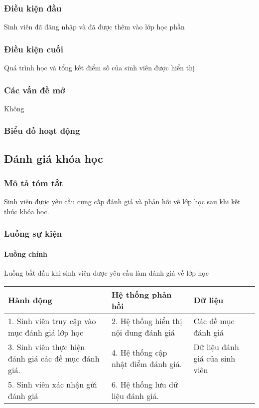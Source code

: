 \documentclass[./../main_file.tex]{subfiles}
\begin{document}
\subsubsection{Điều kiện đầu}
Sinh viên đã đăng nhập và đã được thêm vào lớp học phần

\subsubsection{Điều kiện cuối}
Quá trình học và tổng kết điểm số của sinh viên được hiển thị

\subsubsection{Các vấn đề mở}
Không

\subsubsection{Biểu đồ hoạt động}

\subsection{Đánh giá khóa học}
\subsubsection{Mô tả tóm tắt}
Sinh viên được yêu cầu cung cấp đánh giá và phản hồi về lớp học sau khi kết thúc khóa học.

\subsubsection{Luồng sự kiện}
\paragraph{Luồng chính}
Luồng bắt đầu khi sinh viên được yêu cầu làm đánh giá về lớp học
\begin{table}[H]
				\begin{tabular}{|p{.33\textwidth}|p{}|p{}|}
		\hline
		\textbf{Hành động}              & \textbf{Hệ thống phản hồi}     & \textbf{Dữ liệu} \\ \hline
		1. Sinh viên truy cập vào mục đánh giá lớp học       & 2. Hệ thống hiển thị nội dung đánh giá & Các đề mục đánh giá            \\ \hline
		3. Sinh viên thực hiện đánh giá các đề mục đánh giá. & 4. Hệ thống cập nhật điểm đánh giá.    & Dữ liệu đánh giá của sinh viên \\ \hline
		5. Sinh viên xác nhận gửi đánh giá & 6. Hệ thống lưu dữ liệu đánh giá. &                  \\ \hline
	\end{tabular}
\end{table}
\end{document}
